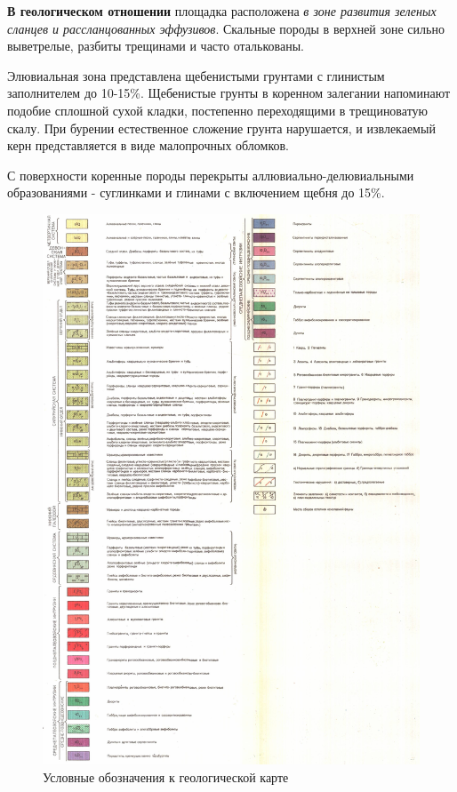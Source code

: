 \documentclass[a4paper,12pt]{article} %
\begin{document}
\textbf{В геологическом  отношении} площадка  расположена  \textit{в зоне развития зеленых сланцев и рассланцованных эффузивов}. Скальные породы в верхней зоне сильно выветрелые, разбиты трещинами и  часто оталькованы. 

Элювиальная зона представлена щебенистыми грунтами с глинистым заполнителем до 10-15\%. Щебенистые грунты в коренном залегании напоминают подобие сплошной сухой кладки, постепенно переходящими в трещиноватую скалу. При бурении естественное сложение грунта нарушается, и извлекаемый керн представляется в виде малопрочных обломков.

С поверхности коренные породы перекрыты аллювиально-делювиальными образованиями - суглинками и глинами с включением щебня до 15\%.

\begin{figure}[!h]
	\centering
	\includegraphics[height=0.95\textheight]{Legend-o-41-25}
	\caption[Условные обозначения]{Условные обозначения к геологической карте}
	\label{img:legend}
\end{figure}
\end{document}
